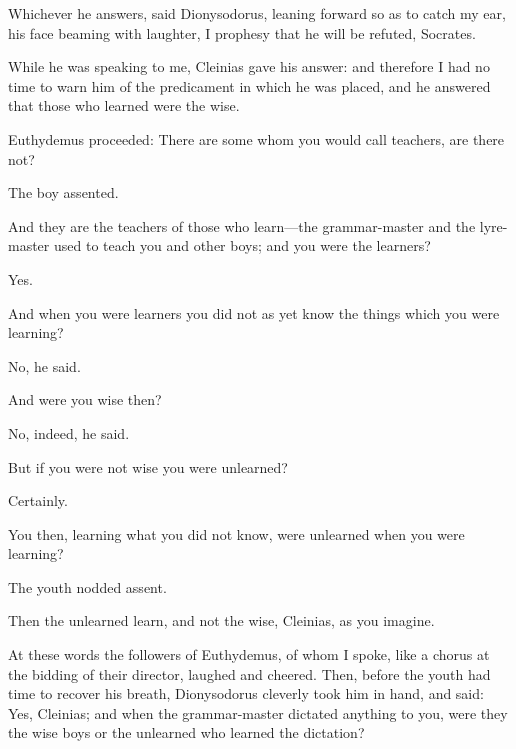 \documentclass[11pt,letter]{article}
\begin{document}
\par  Whichever he answers, said Dionysodorus, leaning forward so as to catch my ear, his face beaming with laughter, I prophesy that he will be refuted, Socrates.

\par  While he was speaking to me, Cleinias gave his answer: and therefore I had no time to warn him of the predicament in which he was placed, and he answered that those who learned were the wise.

\par  Euthydemus proceeded: There are some whom you would call teachers, are there not?

\par  The boy assented.

\par  And they are the teachers of those who learn—the grammar-master and the lyre-master used to teach you and other boys; and you were the learners?

\par  Yes.

\par  And when you were learners you did not as yet know the things which you were learning?

\par  No, he said.

\par  And were you wise then?

\par  No, indeed, he said.

\par  But if you were not wise you were unlearned?

\par  Certainly.

\par  You then, learning what you did not know, were unlearned when you were learning?

\par  The youth nodded assent.

\par  Then the unlearned learn, and not the wise, Cleinias, as you imagine.

\par  At these words the followers of Euthydemus, of whom I spoke, like a chorus at the bidding of their director, laughed and cheered. Then, before the youth had time to recover his breath, Dionysodorus cleverly took him in hand, and said: Yes, Cleinias; and when the grammar-master dictated anything to you, were they the wise boys or the unlearned who learned the dictation?
\end{document}
